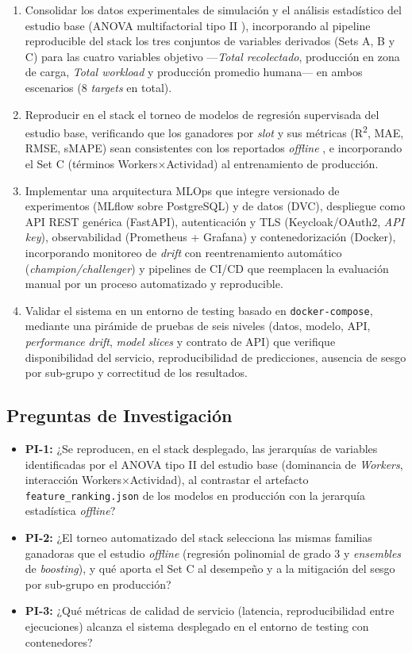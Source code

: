 \documentclass[conference]{IEEEtran}
\begin{document}
\begin{enumerate}
    \item Consolidar los datos experimentales de simulación y el análisis estadístico del estudio base (ANOVA multifactorial tipo II \cite{langsrud2003,garcia2026}), incorporando al pipeline reproducible del stack los tres conjuntos de variables derivados (Sets A, B y C) para las cuatro variables objetivo —\textit{Total recolectado}, producción en zona de carga, \textit{Total workload} y producción promedio humana— en ambos escenarios (8 \textit{targets} en total).
    \item Reproducir en el stack el torneo de modelos de regresión supervisada del estudio base, verificando que los ganadores por \textit{slot} y sus métricas (R\textsuperscript{2}, MAE, RMSE, sMAPE) sean consistentes con los reportados \textit{offline} \cite{garcia2026}, e incorporando el Set C (términos Workers$\times$Actividad) al entrenamiento de producción.
    \item Implementar una arquitectura MLOps que integre versionado de experimentos (MLflow sobre PostgreSQL) y de datos (DVC), despliegue como API REST genérica (FastAPI), autenticación y TLS (Keycloak/OAuth2, \textit{API key}), observabilidad (Prometheus + Grafana) y contenedorización (Docker), incorporando monitoreo de \textit{drift} con reentrenamiento automático (\textit{champion/challenger}) y pipelines de CI/CD que reemplacen la evaluación manual por un proceso automatizado y reproducible.
    \item Validar el sistema en un entorno de testing basado en \texttt{docker-compose}, mediante una pirámide de pruebas de seis niveles (datos, modelo, API, \textit{performance drift}, \textit{model slices} y contrato de API) que verifique disponibilidad del servicio, reproducibilidad de predicciones, ausencia de sesgo por sub-grupo y correctitud de los resultados.
\end{enumerate}

\subsection{Preguntas de Investigación}

\begin{itemize}
    \item \textbf{PI-1:} ¿Se reproducen, en el stack desplegado, las jerarquías de variables identificadas por el ANOVA tipo II del estudio base (dominancia de \textit{Workers}, interacción Workers$\times$Actividad), al contrastar el artefacto \texttt{feature\_ranking.json} de los modelos en producción con la jerarquía estadística \textit{offline}?
    \item \textbf{PI-2:} ¿El torneo automatizado del stack selecciona las mismas familias ganadoras que el estudio \textit{offline} (regresión polinomial de grado 3 y \textit{ensembles} de \textit{boosting}), y qué aporta el Set C al desempeño y a la mitigación del sesgo por sub-grupo en producción?
    \item \textbf{PI-3:} ¿Qué métricas de calidad de servicio (latencia, reproducibilidad entre ejecuciones) alcanza el sistema desplegado en el entorno de testing con contenedores?
\end{itemize}
\end{document}
